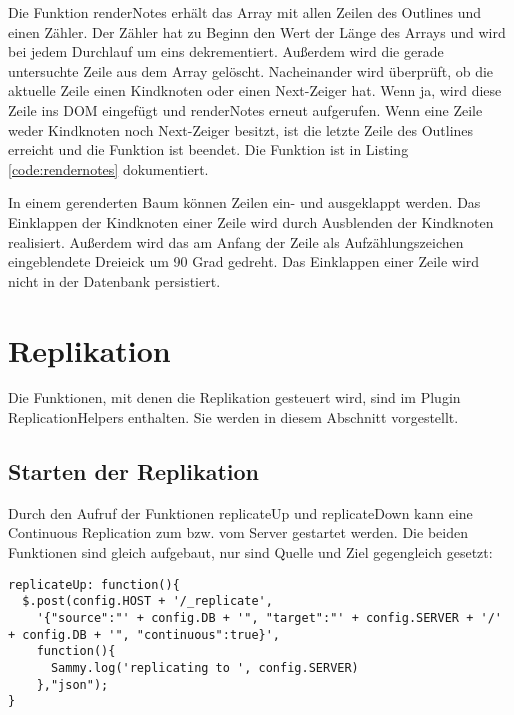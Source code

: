 Die Funktion {\selectfont renderNotes} erhält das Array mit allen Zeilen des Outlines und einen Zähler. Der Zähler hat zu Beginn den Wert der Länge des Arrays und wird bei jedem Durchlauf um eins dekrementiert. Außerdem wird die gerade untersuchte Zeile aus dem Array gelöscht. Nacheinander wird überprüft, ob die aktuelle Zeile einen Kindknoten oder einen Next-Zeiger hat. Wenn ja, wird diese Zeile ins DOM eingefügt und {\selectfont renderNotes} erneut aufgerufen. Wenn eine Zeile weder Kindknoten noch Next-Zeiger besitzt, ist die letzte Zeile des Outlines erreicht und die Funktion ist beendet. Die Funktion ist in Listing \ref{code:rendernotes} dokumentiert.

In einem gerenderten Baum können Zeilen ein- und ausgeklappt werden. Das Einklappen der Kindknoten einer Zeile wird durch Ausblenden der Kindknoten realisiert. Außerdem wird das am Anfang der Zeile als Aufzählungszeichen eingeblendete Dreieick um 90 Grad gedreht. Das Einklappen einer Zeile wird nicht in der Datenbank persistiert.









\section{Replikation}
\label{subsec:repl-impl}

Die Funktionen, mit denen die Replikation gesteuert wird, sind im Plugin {\selectfont ReplicationHelpers} enthalten. Sie werden in diesem Abschnitt vorgestellt. 


\subsection{Starten der Replikation}

Durch den Aufruf der Funktionen {\selectfont replicateUp} und {\selectfont replicateDown} kann eine Continuous Replication zum bzw. vom Server gestartet werden. Die beiden Funktionen sind gleich aufgebaut, nur sind Quelle und Ziel gegengleich gesetzt:

\lstset{language=javascript}
\medskip 
\begin{lstlisting}[caption=Die Funktion {\fontfamily{pcr}\selectfont replicateUp}]
replicateUp: function(){
  $.post(config.HOST + '/_replicate', 
    '{"source":"' + config.DB + '", "target":"' + config.SERVER + '/' + config.DB + '", "continuous":true}',
    function(){
      Sammy.log('replicating to ', config.SERVER)
    },"json");
}
\end{lstlisting}


